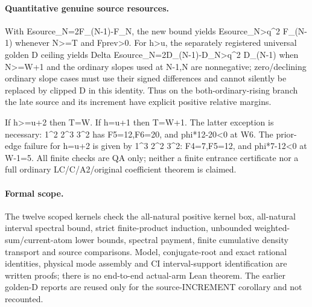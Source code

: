 \paragraph{Quantitative genuine source resources.}
With Esource_N=2F_(N-1)-F_N, the new bound yields
Esource_N>q^2 F_(N-1) whenever N>=T and Fprev>0.
For h>u, the separately registered universal golden D ceiling yields
Delta Esource_N=2D_(N-1)-D_N>q^2 D_(N-1)
when N>=W+1 and the ordinary slopes used at N-1,N are nonnegative;
zero/declining ordinary slope cases must use their signed differences
and cannot silently be replaced by clipped D in this identity.
Thus on the both-ordinary-rising branch the late source and its
increment have explicit positive relative margins.

If h>=u+2 then T=W. If h=u+1 then T=W+1. The latter exception
is necessary: 1^2 2^3 3^2 has F5=12,F6=20, and phi*12-20<0
at W6. The prior-edge failure for h=u+2 is given by
1^3 2^2 3^2: F4=7,F5=12, and phi*7-12<0 at W-1=5.
All finite checks are QA only; neither a finite entrance certificate
nor a full ordinary LC/C/A2/original coefficient theorem is claimed.

\paragraph{Formal scope.}
The twelve scoped kernels check the all-natural positive kernel box,
all-natural interval spectral bound, strict finite-product induction,
unbounded weighted-sum/current-atom lower bounds, spectral payment,
finite cumulative density transport and source comparisons. Model,
conjugate-root and exact rational identities, physical mode assembly
and CI interval-support identification are written proofs; there is
no end-to-end actual-arm Lean theorem. The earlier golden-D reports
are reused only for the source-INCREMENT corollary and not recounted.
